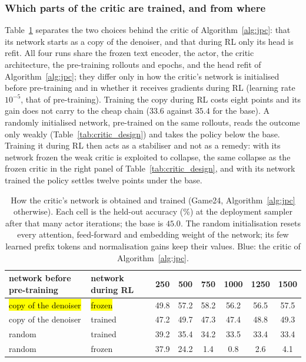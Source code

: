 \subsubsection{Which parts of the critic are trained, and from where}
\label{app:critic_training}
Table~\ref{tab:critic_training} separates the two choices behind the critic of Algorithm~\ref{alg:jpc}: that its network starts as a copy of the denoiser, and that during RL only its head is refit. All four runs share the frozen text encoder, the actor, the critic architecture, the pre-training rollouts and epochs, and the head refit of Algorithm~\ref{alg:jpc}; they differ only in how the critic's network is initialised before pre-training and in whether it receives gradients during RL (learning rate $10^{-5}$, that of pre-training). Training the copy during RL costs eight points and its gain does not carry to the cheap chain ($33.6$ against $35.4$ for the base). A randomly initialised network, pre-trained on the same rollouts, reads the outcome only weakly (Table~\ref{tab:critic_design}) and takes the policy below the base. Training it during RL then acts as a stabiliser and not as a remedy: with its network frozen the weak critic is exploited to collapse, the same collapse as the frozen critic in the right panel of Table~\ref{tab:critic_design}, and with its network trained the policy settles twelve points under the base.
\begin{table}[H]\centering\small
\caption{How the critic's network is obtained and trained (Game24, Algorithm~\ref{alg:jpc} otherwise). Each cell is the held-out accuracy (\%) at the deployment sampler after that many actor iterations; the base is $45.0$. The random initialisation resets every attention, feed-forward and embedding weight of the network; its few learned prefix tokens and normalisation gains keep their values. Blue: the critic of Algorithm~\ref{alg:jpc}.}\label{tab:critic_training}
\begin{tabular}{@{}llcccccc@{}}\toprule
network before pre-training & network during RL & 250 & 500 & 750 & 1000 & 1250 & 1500 \\\midrule
\hl{copy of the denoiser} & \hl{frozen} & 49.8 & 57.2 & 58.2 & 56.2 & 56.5 & 57.5 \\
copy of the denoiser & trained & 47.2 & 49.7 & 47.3 & 47.4 & 48.8 & 49.3 \\
random & trained & 39.2 & 35.4 & 34.2 & 33.5 & 33.4 & 33.4 \\
random & frozen & 37.9 & 24.2 & \phantom{0}1.4 & \phantom{0}0.8 & \phantom{0}2.6 & \phantom{0}4.1 \\
\bottomrule\end{tabular}\end{table}

